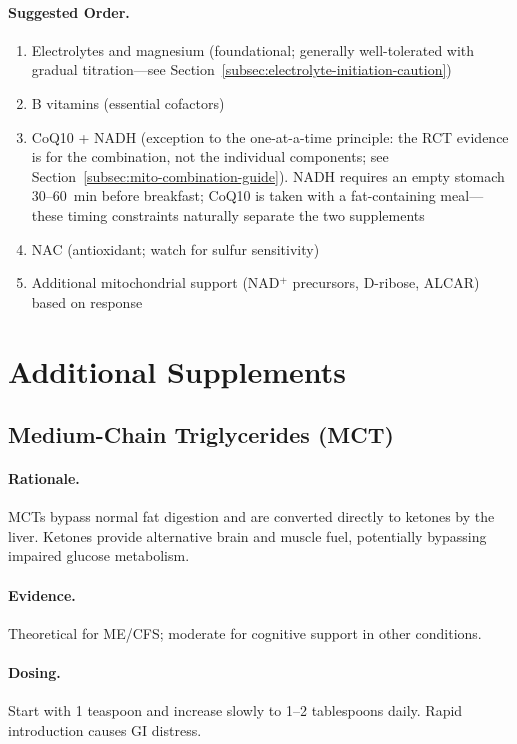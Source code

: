 \paragraph{Suggested Order.}
\begin{enumerate}
    \item Electrolytes and magnesium (foundational; generally well-tolerated with gradual titration---see Section~\ref{subsec:electrolyte-initiation-caution})
    \item B vitamins (essential cofactors)
    \item CoQ10 + NADH (exception to the one-at-a-time principle: the RCT evidence is for the combination, not the individual components; see Section~\ref{subsec:mito-combination-guide}). NADH requires an empty stomach 30--60~min before breakfast; CoQ10 is taken with a fat-containing meal---these timing constraints naturally separate the two supplements
    \item NAC (antioxidant; watch for sulfur sensitivity)
    \item Additional mitochondrial support (NAD$^+$ precursors, D-ribose, ALCAR) based on response
\end{enumerate}

\section{Additional Supplements}
\label{sec:additional-supplements}

\subsection{Medium-Chain Triglycerides (MCT)}

\paragraph{Rationale.} MCTs bypass normal fat digestion and are converted directly to ketones by the liver. Ketones provide alternative brain and muscle fuel, potentially bypassing impaired glucose metabolism.

\paragraph{Evidence.} Theoretical for ME/CFS; moderate for cognitive support in other conditions.

\paragraph{Dosing.} Start with 1 teaspoon and increase slowly to 1--2 tablespoons daily. Rapid introduction causes GI distress.

